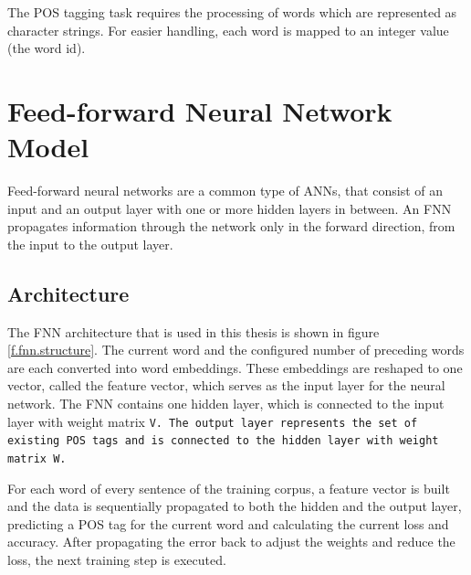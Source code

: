 The POS tagging task requires the processing of words which are represented as character strings. For easier handling, each word is mapped to an integer value (the word id).

\section{Feed-forward Neural Network Model}\label{c.postagging.fnn}
Feed-forward neural networks are a common type of ANNs, that consist of an input and an output layer with one or more hidden layers in between. An FNN propagates information through the network only in the forward direction, from the input to the output layer.

\subsection{Architecture}\label{c.postagging.fnn.architecture}
The FNN architecture that is used in this thesis is shown in figure \ref{f.fnn.structure}. The current word and the configured number of preceding words are each converted into word embeddings. These embeddings are reshaped to one vector, called the feature vector, which serves as the input layer for the neural network. The FNN contains one hidden layer, which is connected to the input layer with weight matrix \tt{V}. The output layer represents the set of existing POS tags and is connected to the hidden layer with weight matrix \tt{W}.

For each word of every sentence of the training corpus, a feature vector is built and the data is sequentially propagated to both the hidden and the output layer, predicting a POS tag for the current word and calculating the current loss and accuracy. After propagating the error back to adjust the weights and reduce the loss, the next training step is executed.

